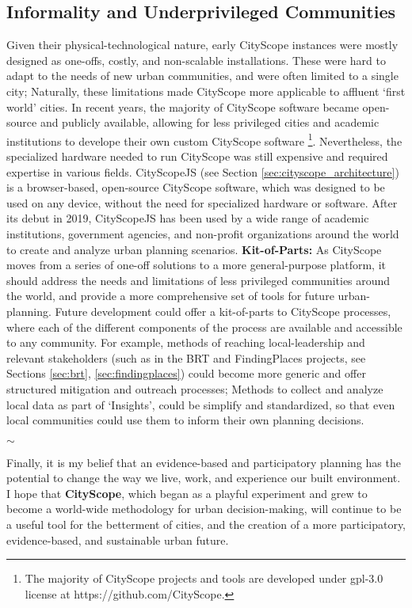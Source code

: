 {{      \subsection{Informality and Underprivileged Communities}
      {
          Given their physical-technological nature, early CityScope instances were mostly designed as one-offs, costly, and non-scalable installations. These were hard to adapt to the needs of new urban communities, and were often limited to a single city; Naturally, these limitations made CityScope more applicable to affluent `first world' cities. In recent years, the majority of CityScope software became open-source and publicly available, allowing for less privileged cities and academic institutions to develope their own custom CityScope software \footnote{The majority of CityScope projects and tools are developed under gpl-3.0 license at https://github.com/CityScope.}. Nevertheless, the specialized hardware needed to run CityScope was still expensive and required expertise in various fields. CityScopeJS (see Section \eqref{sec:cityscope_architecture}) is a browser-based, open-source CityScope software, which was designed to be used on any device, without the need for specialized hardware or software. After its debut in 2019, CityScopeJS has been used by a wide range of academic institutions, government agencies, and non-profit organizations around the world to create and analyze urban planning scenarios.
          \newline
          \textbf{Kit-of-Parts:} As CityScope moves from a series of one-off solutions to a more general-purpose platform, it should address the needs and limitations of less privileged communities around the world, and provide a more comprehensive set of tools for future urban-planning. Future development could offer a kit-of-parts to CityScope processes, where each of the different components of the process are available and accessible to any community. For example, methods of reaching local-leadership and relevant stakeholders (such as in the BRT and FindingPlaces projects, see Sections \eqref{sec:brt}, \eqref{sec:findingplaces}) could become more generic and offer structured mitigation and outreach processes; Methods to collect and analyze local data as part of `Insights', could be simplify and standardized, so that even local communities could use them to inform their own planning decisions.
      }
     }


    \bigskip
    \begin{center}
        $\sim$
    \end{center}
    \bigskip
    {
        Finally, it is my belief that an evidence-based and participatory planning has the potential to change the way we live, work, and experience our built environment. I hope that \textbf{CityScope}, which began as a playful experiment and grew to become a world-wide methodology for urban decision-making, will continue to be a useful tool for the betterment of cities, and the creation of a more participatory, evidence-based, and sustainable urban future.
    }

}


